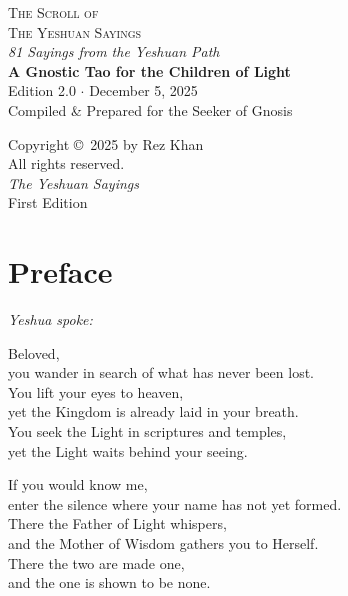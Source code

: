 \documentclass[10pt, openright]{book}
\begin{document}
\begin{titlepage}
    \centering
    \vspace*{1.5cm}
    {\Huge \textsc{The Scroll of}\\ \textsc{The Yeshuan Sayings}} \\
    \vspace{0.5cm}
    {\large \textit{81 Sayings from the Yeshuan Path}} \\
    \vspace{2cm}
     	\textbf{A Gnostic Tao for the Children of Light} \\
    \vspace{0.5cm}
    {\small Edition 2.0 $\cdot$ December 5, 2025} \\
    \vfill
    {\small Compiled \& Prepared for the Seeker of Gnosis}
    \vspace{1cm}
\end{titlepage}

\newpage
\thispagestyle{empty}
\vspace*{\fill}
\begin{center}
    \small
    Copyright \copyright\ 2025 by Rez Khan \\
    All rights reserved. \\
    \vspace{0.5cm}
    \textit{The Yeshuan Sayings} \\
    First Edition
\end{center}
\vspace{1cm}
\newpage

\frontmatter
\tableofcontents

\chapter{Preface}
\textit{Yeshua spoke:}

Beloved, \\
you wander in search of what has never been lost. \\
You lift your eyes to heaven, \\
yet the Kingdom is already laid in your breath. \\
You seek the Light in scriptures and temples, \\
yet the Light waits behind your seeing.

If you would know me, \\
enter the silence where your name has not yet formed. \\
There the Father of Light whispers, \\
and the Mother of Wisdom gathers you to Herself. \\
There the two are made one, \\
and the one is shown to be none.
\end{document}
